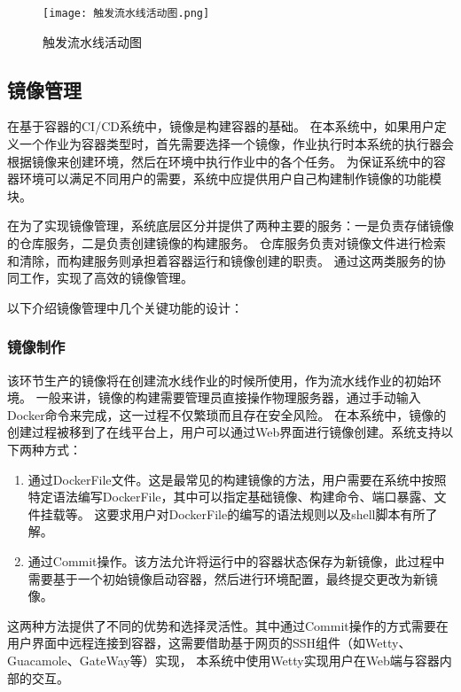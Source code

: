\begin{figure}[h]
  \centering
  \texttt{[image: 触发流水线活动图.png]}
  \caption{触发流水线活动图}
  \label{fig:触发流水线活动图}
\end{figure}

\subsection{镜像管理}
\label{subsec:镜像管理}

在基于容器的CI/CD系统中，镜像是构建容器的基础。
在本系统中，如果用户定义一个作业为容器类型时，首先需要选择一个镜像，作业执行时本系统的执行器会根据镜像来创建环境，然后在环境中执行作业中的各个任务。
为保证系统中的容器环境可以满足不同用户的需要，系统中应提供用户自己构建制作镜像的功能模块。

在为了实现镜像管理，系统底层区分并提供了两种主要的服务：一是负责存储镜像的仓库服务，二是负责创建镜像的构建服务。
仓库服务负责对镜像文件进行检索和清除，而构建服务则承担着容器运行和镜像创建的职责。
通过这两类服务的协同工作，实现了高效的镜像管理。

以下介绍镜像管理中几个关键功能的设计：

\subsubsection{镜像制作}

该环节生产的镜像将在创建流水线作业的时候所使用，作为流水线作业的初始环境。
一般来讲，镜像的构建需要管理员直接操作物理服务器，通过手动输入Docker命令来完成，这一过程不仅繁琐而且存在安全风险。
在本系统中，镜像的创建过程被移到了在线平台上，用户可以通过Web界面进行镜像创建。系统支持以下两种方式：
\begin{enumerate}
  \item 通过DockerFile文件。这是最常见的构建镜像的方法，用户需要在系统中按照特定语法编写DockerFile，其中可以指定基础镜像、构建命令、端口暴露、文件挂载等。
  这要求用户对DockerFile的编写的语法规则以及shell脚本有所了解。
  \item 通过Commit操作。该方法允许将运行中的容器状态保存为新镜像，此过程中需要基于一个初始镜像启动容器，然后进行环境配置，最终提交更改为新镜像。
\end{enumerate}

这两种方法提供了不同的优势和选择灵活性。其中通过Commit操作的方式需要在用户界面中远程连接到容器，这需要借助基于网页的SSH组件（如Wetty、Guacamole、GateWay等）实现，
本系统中使用Wetty实现用户在Web端与容器内部的交互。

